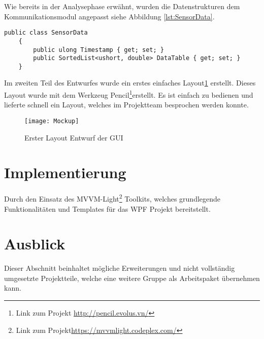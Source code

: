 Wie bereits in der Analysephase erwähnt, wurden die Datenstrukturen dem Kommunikationsmodul angepasst siehe Abbildung \ref{lst:SensorData}.\\
\begin{lstlisting}[frame=single, caption=Beschreibung der Sensordatenstruktur, label=lst:SensorData]
    public class SensorData
    {
        public ulong Timestamp { get; set; }
        public SortedList<ushort, double> DataTable { get; set; }
    }
\end{lstlisting}
Im zweiten Teil des Entwurfes wurde ein erstes einfaches Layout\ref{fig:gui} erstellt. Dieses Layout wurde mit dem Werkzeug Pencil\footnote{Link zum Projekt \url{http://pencil.evolus.vn/}}erstellt. Es ist einfach zu bedienen und lieferte schnell ein Layout, welches im Projektteam besprochen werden konnte.

\begin{figure}[h]
	\centering
		\texttt{[image: Mockup]}
		\caption{Erster Layout Entwurf der GUI}
		\label{fig:gui}
\end{figure}


\section{Implementierung}
 
 Durch den Einsatz des MVVM-Light\footnote{Link zum Projekt\url{https://mvvmlight.codeplex.com/}} Toolkits, welches grundlegende Funktionalitäten und Templates für das WPF Projekt bereitstellt.
\section{Ausblick}
Dieser Abschnitt beinhaltet mögliche Erweiterungen und nicht vollständig umgesetzte Projektteile, welche eine weitere Gruppe als Arbeitspaket übernehmen kann. 




